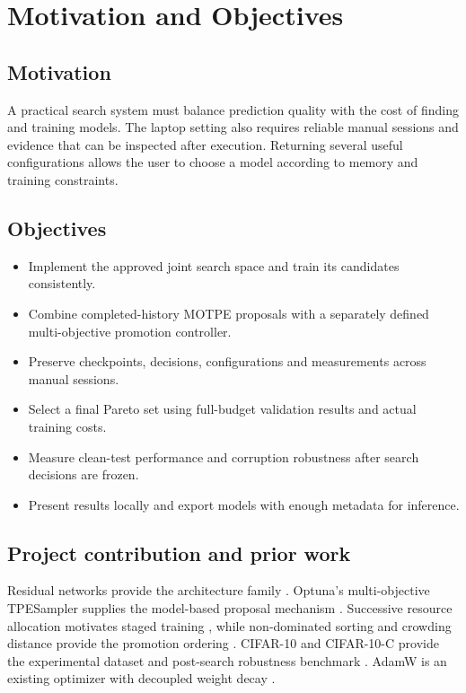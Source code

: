 \documentclass[11pt,a4paper,oneside]{report}
\begin{document}
\chapter{Motivation and Objectives}
\section{Motivation}
A practical search system must balance prediction quality with the cost of finding and training models. The laptop setting also requires reliable manual sessions and evidence that can be inspected after execution. Returning several useful configurations allows the user to choose a model according to memory and training constraints.

\section{Objectives}
\begin{itemize}
\item Implement the approved joint search space and train its candidates consistently.
\item Combine completed-history MOTPE proposals with a separately defined multi-objective promotion controller.
\item Preserve checkpoints, decisions, configurations and measurements across manual sessions.
\item Select a final Pareto set using full-budget validation results and actual training costs.
\item Measure clean-test performance and corruption robustness after search decisions are frozen.
\item Present results locally and export models with enough metadata for inference.
\end{itemize}

\section{Project contribution and prior work}
Residual networks provide the architecture family \cite{resnet}. Optuna's multi-objective TPESampler supplies the model-based proposal mechanism \cite{optuna}. Successive resource allocation motivates staged training \cite{halving}, while non-dominated sorting and crowding distance provide the promotion ordering \cite{nsga}. CIFAR-10 and CIFAR-10-C provide the experimental dataset and post-search robustness benchmark \cite{cifar,corruptions}. AdamW is an existing optimizer with decoupled weight decay \cite{adamw}.
\end{document}
